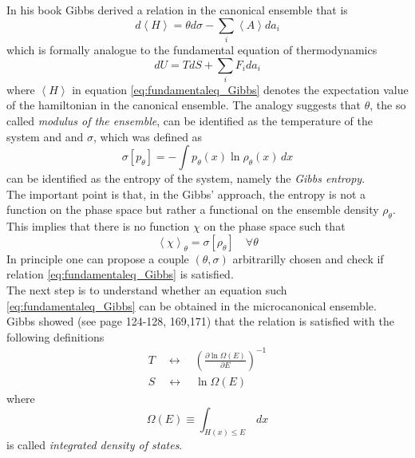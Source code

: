 In his book \cite{gibbs_2010} Gibbs derived a relation in the canonical ensemble that is
\begin{equation}
    d\left\langle H \right\rangle = \theta d\sigma - \sum_i \left\langle A \right\rangle da_i
    \label{eq:fundamentaleq_Gibbs}
\end{equation}
which is formally analogue to the fundamental equation of thermodynamics
\begin{equation*}
    dU = TdS + \sum_i F_i da_i
\end{equation*}
where $\left\langle H \right\rangle$ in equation \ref{eq:fundamentaleq_Gibbs} denotes the expectation value of the hamiltonian in the canonical ensemble.
The analogy suggests that $\theta$, the so called \emph{modulus of the ensemble}, can be identified as the temperature of the system and  and $\sigma$, which was defined as
\begin{equation*}
    \sigma[p_{\theta}] = - \int p_{\theta}(x) \ln \rho_{\theta}(x) \, dx
\end{equation*}
can be identified as the entropy of the system, namely the \emph{Gibbs entropy}. \\
The important point is that, in the Gibbs' approach, the entropy is not a function on the phase space but rather a functional on the ensemble density $\rho_{\theta}$. This implies that there is no function $\chi$ on the phase space such that 
\begin{equation*}
    \left\langle \chi \right\rangle_{\theta} = \sigma[\rho_{\theta}] \quad \forall \theta
\end{equation*}
In principle one can propose a couple $(\theta, \sigma)$ arbitrarilly chosen and check if relation \ref{eq:fundamentaleq_Gibbs} is satisfied. \\
The next step is to understand whether an equation such \ref{eq:fundamentaleq_Gibbs} can be obtained in the microcanonical ensemble. Gibbs showed (see \cite{gibbs_2010} page 124-128, 169,171) that the relation is satisfied with the following definitions
\begin{gather*}
    T \quad \longleftrightarrow \quad \left(\frac{\partial \ln \Omega(E)}{\partial E}\right)^{-1} \\
    S \quad \longleftrightarrow \quad \ln \Omega(E)
\end{gather*}
where 
\begin{equation}
    \Omega(E) \equiv \int_{H(x) \leq E} \, dx
    \label{eq:Omega_E}
\end{equation}
is called \emph{integrated density of states}. 

